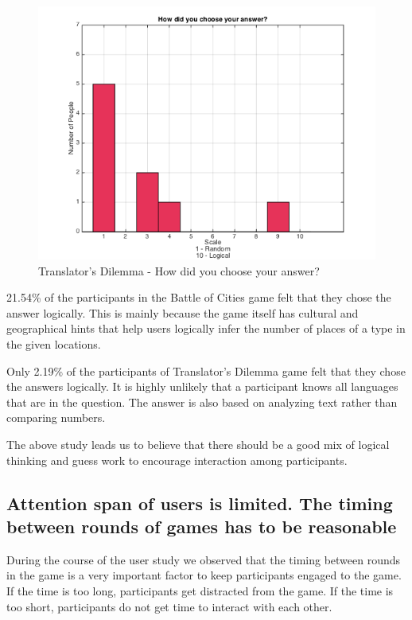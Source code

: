 \documentclass{sig-alternate}
\begin{document}
\begin{figure}
	\includegraphics[width=\linewidth]{t_random_logical.png}
	\caption{Translator's Dilemma - How did you choose your answer?}
	\label{fig:t_random_logical}
\end{figure}

21.54\% of the participants in the Battle of Cities game felt that they chose the answer logically. This is mainly because the game itself has cultural and geographical hints that help users logically infer the number of places of a type in the given locations. 

Only 2.19\% of the participants of Translator's Dilemma game felt that they chose the answers logically. It is highly unlikely that a participant knows all languages that are in the question. The answer is also based on analyzing text rather than comparing numbers.

The above study leads us to believe that there should be a good mix of logical thinking and guess work to encourage interaction among participants. 

\subsection{Attention span of users is limited. The timing between rounds of games has to be reasonable}
During the course of the user study we observed that the timing between rounds in the game is a very important factor to keep participants engaged to the game. If the time is too long, participants get distracted from the game. If the time is too short, participants do not get time to interact with each other. 
\end{document}
